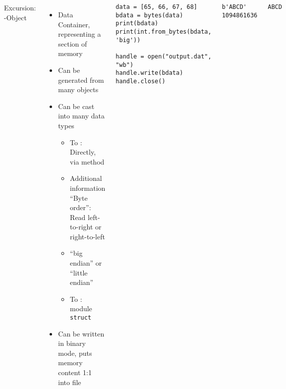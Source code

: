 \begin{frame}[fragile]
%

\vspace{-12pt}
\begin{columns}[T]

\vspace{12pt}
\begin{Large}
	{Excursion: -Object}
	\vspace{6pt}
\end{Large}
%
\begin{itemize}
\item Data Container, representing a section of memory
\item Can be generated from many objects
\item Can be cast into many data types
	\begin{itemize}
	\item To : Directly, via method 
	\item Additional information \enquote{Byte order}: Read left-to-right or right-to-left
	\item \enquote{big endian} or \enquote{little endian}
	\item To : module \texttt{struct}
	\end{itemize}
\item Can be written in binary mode, puts memory content 1:1 into file
\end{itemize}
%
\begin{codebox}
\begin{verbatim}
data = [65, 66, 67, 68]
bdata = bytes(data)
print(bdata)
print(int.from_bytes(bdata, 'big'))

handle = open("output.dat", "wb")
handle.write(bdata)
handle.close()
\end{verbatim}
\end{codebox}
%
\begin{cmdbox}
\begin{verbatim}
b'ABCD'
1094861636
\end{verbatim}
\end{cmdbox}
%
\begin{cmdbox}
\begin{verbatim}
ABCD
\end{verbatim}
\end{cmdbox}
\end{columns}
%
\end{frame}

